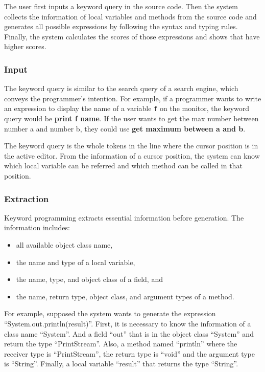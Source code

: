 \documentclass[PRO,english]{ipsj}
\begin{document}
The user first inputs a keyword query in the source code. Then the system collects the information of local variables and methods from the source code and generates all possible expressions by following the syntax and typing rules. Finally, the system calculates the scores of those expressions and shows that have higher scores.
\subsubsection{Input}
The keyword query is similar to the search query of a search engine, which conveys the programmer’s intention. For example, if a programmer wants to write an expression to display the name of a variable \texttt{f} on the monitor, the keyword query would be \textbf{print f name}. If the user wants to get the max number between number a and number b, they could use \textbf{get maximum between a and b}.

The keyword query is the whole tokens in the line where the cursor position is in the active editor. From the information of a cursor position, the system can know which local variable can be referred and which method can be called in that position.

\subsubsection{Extraction}
Keyword programming extracts essential information before generation. The information includes:
\begin{itemize}
\item all available object class name,
\item the name and type of a local variable,
\item the name, type, and object class of a field, and
\item the name, return type, object class, and argument types of a method.
\end{itemize}

For example, supposed the system wants to generate the expression “System.out.println(result)”. First, it is necessary to know the information of a class name “System”. And a field “out” that is in the object class “System” and return the type “PrintStream”. Also, a method named “println” where the receiver type is “PrintStream”, the return type is “void” and the argument type is “String”. Finally, a local variable “result” that returns the type “String”.
\end{document}
